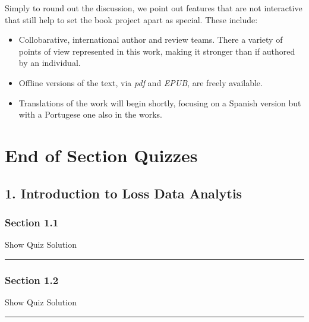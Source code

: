 \documentclass[]{article}
\providecommand{\tightlist}{%
  \setlength{\itemsep}{0pt}\setlength{\parskip}{0pt}}
\begin{document}
Simply to round out the discussion, we point out features that are not
interactive that still help to set the book project apart as special.
These include:

\begin{itemize}
\tightlist
\item
  Collobarative, international author and review teams. There a variety
  of points of view represented in this work, making it stronger than if
  authored by an individual.
\item
  Offline versions of the text, via \emph{pdf} and \emph{EPUB}, are
  freely available.
\item
  Translations of the work will begin shortly, focusing on a Spanish
  version but with a Portugese one also in the works.
\end{itemize}

\section{End of Section Quizzes}\label{S:EndSectionQuizzes}

\subsection{1. Introduction to Loss Data
Analytis}\label{introduction-to-loss-data-analytis}

\subsubsection{Section 1.1}\label{section-1.1}

\hypertarget{surveyElement11}{}

\hypertarget{surveyResult11}{}

Show Quiz Solution

\hypertarget{display.Quiz11.2}{}
\begin{center}\rule{0.5\linewidth}{\linethickness}\end{center}

\subsubsection{Section 1.2}\label{section-1.2}

\hypertarget{surveyElement12}{}

\hypertarget{surveyResult12}{}

Show Quiz Solution

\hypertarget{display.Quiz12.2}{}
\begin{center}\rule{0.5\linewidth}{\linethickness}\end{center}
\end{document}
